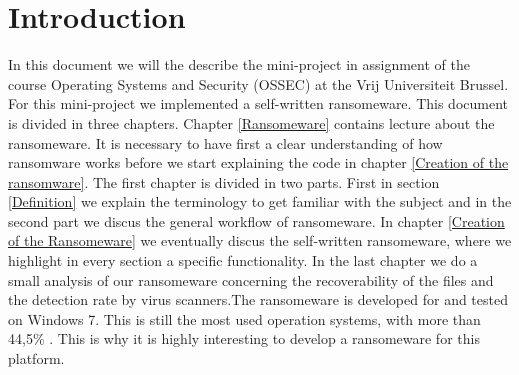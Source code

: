 \chapter{Introduction}\label{introduction}

In this document we will the describe the mini-project in assignment of the course Operating Systems and Security (OSSEC) at the Vrij Universiteit Brussel. For this mini-project we implemented a self-written ransomeware. This document is divided in three chapters. Chapter \ref{Ransomeware} contains lecture about the ransomeware. It is necessary to have first a clear understanding of how ransomware works before we start explaining the code in chapter \ref{Creation of the ransomware}. The first chapter is divided in two parts. First in section \ref{Definition} we explain the terminology to get familiar with the subject and in the second part we discus the general workflow of ransomeware. In chapter \ref{Creation of the Ransomeware} we eventually discus the self-written ransomeware, where we highlight in every section a specific functionality. In the last chapter we do a small analysis of our ransomeware concerning the recoverability of the files and the detection rate by virus scanners.The ransomeware is developed for and tested on Windows 7. This is still the most used operation systems, with more than 44,5\% \cite{OSstats}. This is why it is highly interesting to develop a ransomeware for this platform.

